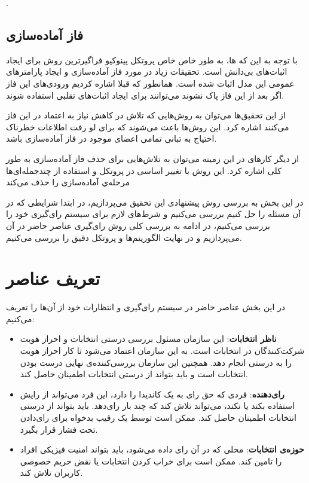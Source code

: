. 
\subsection{فاز آماده‌سازی}
با توجه به این که 
‌ها، به طور خاص خاص پروتکل پینوکیو
فراگیرترین روش برای ایجاد اثبات‌های بی‌دانش است. تحقیقات زیاد در مورد فاز آماده‌سازی و ایجاد پارامترهای عمومی این مدل اثبات شده است. همانطور که قبلا اشاره کردیم ورودی‌های این فاز اگر بعد از این فاز پاک نشوند می‌توانند برای ایجاد اثبات‌های تقلبی استفاده شوند.
\par
از این تحقیق‌ها می‌توان به روش‌هایی
\cite{znsetup} \cite{multipartyparams}
 که تلاش در کاهش نیاز به اعتماد در این فاز می‌کنند اشاره کرد. این روش‌ها باعث می‌شوند که برای لو رفت اطلاعات خطرناک احتیاج به تبانی تمامی اعضای موجود در فاز آماده‌سازی باشد.
 \par
 از دیگر کارهای در این زمینه می‌توان به تلاش‌هایی برای حذف فاز آماده‌سازی به طور کلی اشاره کرد. این روش‌ با تغییر اساسی در پروتکل و استفاده از چندجمله‌ای‌ها 
 \cite{nosetup}
 مرحله‌ي آماده‌سازی را حذف می‌کند

در این بخش به بررسی روش پیشنهادی این تحقیق می‌پردازیم، در ابتدا شرایطی که در آن مسئله را حل کنیم بررسی می‌کنیم و شرط‌های لازم برای سیستم‌ رای‌گیری خود را بررسی می‌کنیم، در ادامه به بررسی کلی روش رای‌گیری عناصر حاضر در آن می‌پردازیم و در نهایت الگوریتم‌ها و پروتکل دقیق را بررسی می‌کنیم.

\section{تعریف عناصر}
در این بخش عناصر حاضر در سیستم رای‌گیری و انتظارات خود از آن‌ها را تعریف می‌کنیم:
\begin{itemize}
	\item
	\textbf{ناظر انتخابات}:
	این سازمان مسئول بررسی درستی انتخابات و احراز هویت شرکت‌کنندگان در انتخابات است. به این سازمان اعتماد می‌شود تا کار احراز هویت را به درستی انجام دهد. همچنین این سازمان بررسی‌کننده‌ی نهایی درست بودن انتخابات است و باید بتواند از درستی انتخابات اطمینان حاصل کند.
	\item
	\textbf{رای‌دهنده}:
	فردی که حق رای به یک کاندیدا را دارد، این فرد می‌تواند از رایش استفاده بکند یا نکند، می‌تواند تلاش کند که چند بار رای‌دهد. باید بتواند از درستی انتخابات اطمینان حاصل کند. ممکن است توسط یک رقیب بدخواه برای رای‌دادن تحت فشار قرار بگیرد.
	\item
	\textbf{حوزه‌ی انتخابات}:
	محلی که در آن رای داده می‌شود، باید بتواند امنیت فیزیکی افراد را تامین کند. ممکن است برای خراب کردن انتخابات یا نقض حریم خصوصی کاربران تلاش کند. 
\end{itemize}
